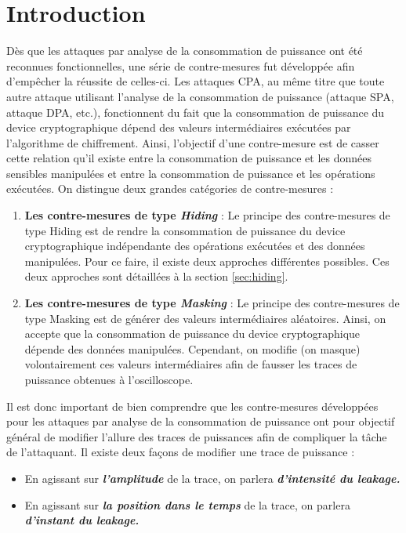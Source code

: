 \documentclass[oneside]{book}
\begin{document}
\section{Introduction}
\label{sec:intro_contremesure}

Dès que les attaques par analyse de la consommation de puissance ont été reconnues fonctionnelles, une série de contre-mesures fut développée afin d'empêcher la réussite de celles-ci. Les attaques CPA, au même titre que toute autre attaque utilisant l'analyse de la consommation de puissance (attaque SPA, attaque DPA, etc.), fonctionnent du fait que la consommation de puissance du device cryptographique dépend des valeurs intermédiaires exécutées par l'algorithme de chiffrement. Ainsi, l'objectif d'une contre-mesure est de casser cette relation qu'il existe entre la consommation de puissance et les données sensibles manipulées et entre la consommation de puissance et les opérations exécutées. On distingue deux grandes catégories de contre-mesures : 
\begin{enumerate}
\item \textbf{Les contre-mesures de type \textit{Hiding}} : Le principe des contre-mesures de type Hiding est de rendre la consommation de puissance du device cryptographique indépendante des opérations exécutées et des données manipulées. Pour ce faire, il existe deux approches différentes possibles. Ces deux approches sont détaillées à la section \ref{sec:hiding}.
\item \textbf{Les contre-mesures de type \textit{Masking}} : Le principe des contre-mesures de type Masking est de générer des valeurs intermédiaires aléatoires. Ainsi, on accepte que la consommation de puissance du device cryptographique dépende des données manipulées. Cependant, on modifie (on masque) volontairement ces valeurs intermédiaires afin de fausser les traces de puissance obtenues à l'oscilloscope. \\
\end{enumerate}

\hspace{-0.5cm}Il est donc important de bien comprendre que les contre-mesures développées pour les attaques par analyse de la consommation de puissance ont pour objectif général de modifier l'allure des traces de puissances afin de compliquer la tâche de l'attaquant. Il existe deux façons de modifier une trace de puissance : 
\begin{itemize}
\item En agissant sur \textbf{\textit{l'amplitude}} de la trace, on parlera \textbf{\textit{d'intensité du leakage.}}
\item En agissant sur \textbf{\textit{la position dans le temps}} de la trace, on parlera \textbf{\textit{d'instant du leakage.}} \\
\end{itemize}
\end{document}
